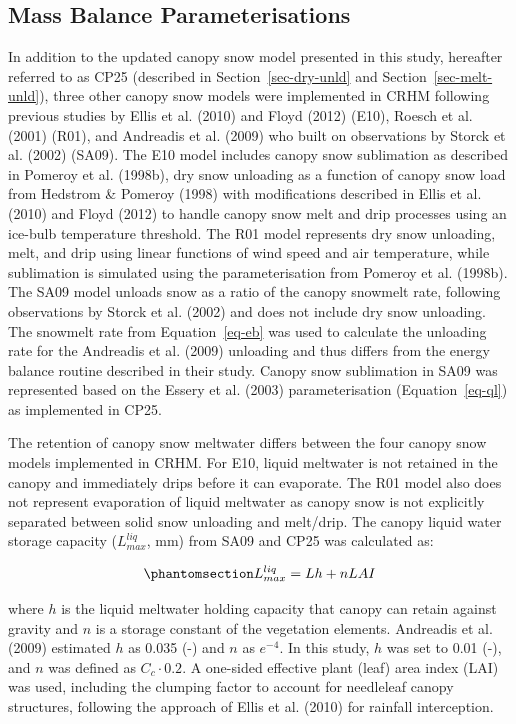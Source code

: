 \documentclass[
  letterpaper,
]{tex/uofsthesis-cs}
\begin{document}
\subsection{Mass Balance
Parameterisations}\label{mass-balance-parameterisations}

In addition to the updated canopy snow model presented in this study,
hereafter referred to as CP25 (described in Section~\ref{sec-dry-unld}
and Section~\ref{sec-melt-unld}), three other canopy snow models were
implemented in CRHM following previous studies by Ellis et al. (2010)
and Floyd (2012) (E10), Roesch et al. (2001) (R01), and Andreadis et al.
(2009) who built on observations by Storck et al. (2002) (SA09). The E10
model includes canopy snow sublimation as described in Pomeroy et al.
(1998b), dry snow unloading as a function of canopy snow load from
Hedstrom \& Pomeroy (1998) with modifications described in Ellis et al.
(2010) and Floyd (2012) to handle canopy snow melt and drip processes
using an ice-bulb temperature threshold. The R01 model represents dry
snow unloading, melt, and drip using linear functions of wind speed and
air temperature, while sublimation is simulated using the
parameterisation from Pomeroy et al. (1998b). The SA09 model unloads
snow as a ratio of the canopy snowmelt rate, following observations by
Storck et al. (2002) and does not include dry snow unloading. The
snowmelt rate from Equation~\ref{eq-eb} was used to calculate the
unloading rate for the Andreadis et al. (2009) unloading and thus
differs from the energy balance routine described in their study. Canopy
snow sublimation in SA09 was represented based on the Essery et al.
(2003) parameterisation (Equation~\ref{eq-ql}) as implemented in CP25.

The retention of canopy snow meltwater differs between the four canopy
snow models implemented in CRHM. For E10, liquid meltwater is not
retained in the canopy and immediately drips before it can evaporate.
The R01 model also does not represent evaporation of liquid meltwater as
canopy snow is not explicitly separated between solid snow unloading and
melt/drip. The canopy liquid water storage capacity (\(L_{max}^{liq}\),
mm) from SA09 and CP25 was calculated as:

\begin{equation}\phantomsection\label{eq-liq-hold-cap}{
L_{max}^{liq} = Lh + nLAI
}\end{equation}

where \(h\) is the liquid meltwater holding capacity that canopy can
retain against gravity and \(n\) is a storage constant of the vegetation
elements. Andreadis et al. (2009) estimated \(h\) as 0.035 (-) and \(n\)
as \(e^{-4}\). In this study, \(h\) was set to 0.01 (-), and \(n\) was
defined as \(C_c\cdot 0.2\). A one-sided effective plant (leaf) area
index (LAI) was used, including the clumping factor to account for
needleleaf canopy structures, following the approach of Ellis et al.
(2010) for rainfall interception.
\end{document}
